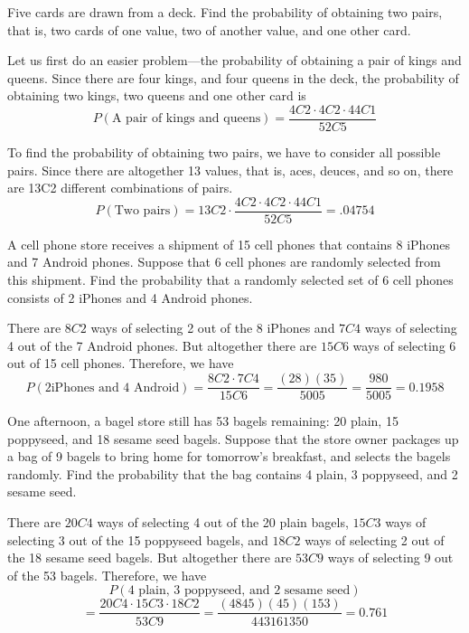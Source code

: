 \begin{example}
    Five cards are drawn from a deck. Find the probability of obtaining two pairs, that is, two cards of one value, two of another value, and one other card.
\end{example}

\begin{solution}
    Let us first do an easier problem—the probability of obtaining a pair of kings and queens. Since there are four kings, and four queens in the deck, the probability of obtaining two kings, two queens and one other card is
    \[ P(\text{A pair of kings and queens}) = \frac{4C2 \cdot 4C2 \cdot 44C1}{52C5} \]

    To find the probability of obtaining two pairs, we have to consider all possible pairs. Since there are altogether 13 values, that is, aces, deuces, and so on, there are 13C2 different combinations of pairs.
    \[ P(\text{Two pairs}) = 13C2 \cdot \frac{4C2 \cdot 4C2 \cdot 44C1}{52C5} = .04754 \]
\end{solution}

\begin{example}
    A cell phone store receives a shipment of 15 cell phones that contains 8 iPhones and 7 Android phones. Suppose that 6 cell phones are randomly selected from this shipment. Find the probability that a randomly selected set of 6 cell phones consists of 2 iPhones and 4 Android phones.
\end{example}

\begin{solution}
    There are \( 8C2 \) ways of selecting 2 out of the 8 iPhones and \( 7C4 \) ways of selecting 4 out of the 7 Android phones. But altogether there are \( 15C6 \) ways of selecting 6 out of 15 cell phones. Therefore, we have
    \[ P(2 \text{iPhones and 4 Android}) = \frac{8C2 \cdot 7C4}{15C6} = \frac{(28)(35)}{5005} = \frac{980}{5005} = 0.1958 \]
\end{solution}

\begin{example}
    One afternoon, a bagel store still has 53 bagels remaining: 20 plain, 15 poppyseed, and 18 sesame seed bagels. Suppose that the store owner packages up a bag of 9 bagels to bring home for tomorrow’s breakfast, and selects the bagels randomly. Find the probability that the bag contains 4 plain, 3 poppyseed, and 2 sesame seed.
\end{example}

\begin{solution}
    There are \( 20C4 \) ways of selecting 4 out of the 20 plain bagels, \( 15C3 \) ways of selecting 3 out of the 15 poppyseed bagels, and \( 18C2 \) ways of selecting 2 out of the 18 sesame seed bagels. But altogether there are \( 53C9 \) ways of selecting 9 out of the 53 bagels. Therefore, we have
    \[ P(4 \text{ plain, 3 poppyseed, and 2 sesame seed}) \]
    \[= \frac{20C4 \cdot 15C3 \cdot 18C2}{53C9} = \frac{(4845)(45)(153)}{443161350} = 0.761 \]
\end{solution}

